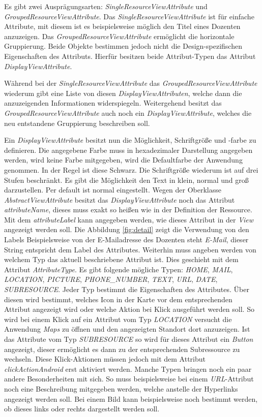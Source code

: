Es gibt zwei Ausprägungsarten: \textit{SingleResourceViewAttribute} und \textit{GroupedResourceViewAttribute}.  Das \textit{SingleResourceViewAttribute} ist für einfache Attribute, mit diesem ist es beispielsweise möglich den Titel eines Dozenten anzuzeigen. Das \textit{GroupedResourceViewAttribute} ermöglicht die horizontale Gruppierung. Beide Objekte bestimmen jedoch nicht die Design-spezifischen Eigenschaften des Attributs. Hierfür besitzen beide Attribut-Typen das Attribut \textit{DisplayViewAttribute}.

Während bei der \textit{SingleResourceViewAttribute} das \textit{GroupedResourceViewAttribute} wiederum gibt eine Liste von diesen \textit{DisplayViewAttributen}, welche dann die anzuzeigenden Informationen widerspiegeln. Weitergehend besitzt das \textit{GroupedResourceViewAttribute} auch noch ein \textit{DisplayViewAttribute}, welches die neu entstandene Gruppierung beschreiben soll.

Ein \textit{DisplayViewAttribute} besitzt nun die Möglichkeit, Schriftgröße und -farbe zu definieren. Die angegebene Farbe muss in hexadezimaler Darstellung angegeben werden, wird keine Farbe mitgegeben, wird die Defaultfarbe der Anwendung genommen. In der Regel ist diese Schwarz.  Die Schriftgröße wiederum ist auf drei Stufen beschränkt. Es gibt die Möglichkeit den Text in klein, normal und groß darzustellen. Per default ist normal eingestellt. Wegen der Oberklasse \textit{AbstractViewAttribute} besitzt das \textit{DisplayViewAttribute} noch das Attribut \textit{attributeName}, dieses muss exakt so heißen wie in der Definition der Ressource.
Mit dem \textit{attributeLabel} kann angegeben werden, wie dieses Attribut in der \textit{View} angezeigt werden soll. Die Abbildung \ref{fig:detail} zeigt die Verwendung von den Labels Beispielsweise von der E-Mailadresse des Dozenten steht \textit{E-Mail}, dieser String entspricht dem Label des Attributes. Weiterhin muss angeben werden von welchem Typ das aktuell beschriebene Attribut ist.
Dies geschieht mit dem Attribut \textit{AttributeType}. Es gibt folgende mögliche Typen: \textit{HOME}, \textit{MAIL}, \textit{LOCATION}, \textit{PICTURE}, \textit{PHONE\_NUMBER}, \textit{TEXT}, \textit{URL}, \textit{DATE}, \textit{SUBRESOURCE}. Jeder Typ bestimmt die Eigenschaften des Attributes. Über diesen wird bestimmt, welches Icon in der Karte vor dem entsprechenden Attribut angezeigt wird oder welche Aktion bei Klick ausgeführt werden soll. So wird bei einem Klick auf ein Attribut vom Typ \textit{LOCATION} versucht die Anwendung \textit{Maps} zu öffnen und den angezeigten Standort dort anzuzeigen. Ist das Attribute vom Typ \textit{SUBRESOURCE} so wird für dieses Attribut ein \textit{Button} angezeigt, dieser ermöglicht es dann zu der entsprechenden Subressource zu wechseln. Diese Klick-Aktionen müssen jedoch mit dem Attribut \textit{clickActionAndroid} erst aktiviert werden.
Manche Typen bringen noch ein paar andere Besonderheiten mit sich. So muss beispielsweise bei einem \textit{URL}-Attribut noch eine Beschreibung mitgegeben werden, welche anstelle der Hyperlinks angezeigt werden soll. Bei einem Bild kann beispielsweise noch bestimmt werden, ob dieses links oder rechts dargestellt werden soll. 

